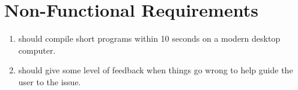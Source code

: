 \section{Non-Functional Requirements}

\begin{enumerate}
    \item \rimp should compile short programs within 10 seconds on a modern desktop computer.
    \item \rimp should give some level of feedback when things go wrong to help guide the user to the issue.
\end{enumerate}
